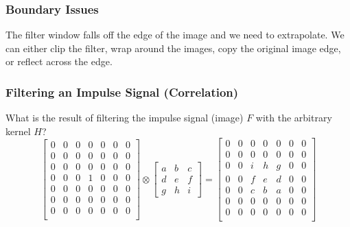 \documentclass{math}
\begin{document}
\subsubsection*{Boundary Issues}
The filter window falls off the edge of the image and we need to extrapolate.
We can either clip the filter, wrap around the images, copy the original image
edge, or reflect across the edge.

\subsubsection*{Filtering an Impulse Signal (Correlation)}
What is the result of filtering the impulse signal (image) \( F \) with the
arbitrary kernel \( H \)?
\[ \begin{bmatrix}
  0 & 0 & 0 & 0 & 0 & 0 & 0 \\
  0 & 0 & 0 & 0 & 0 & 0 & 0 \\
  0 & 0 & 0 & 0 & 0 & 0 & 0 \\
  0 & 0 & 0 & 1 & 0 & 0 & 0 \\
  0 & 0 & 0 & 0 & 0 & 0 & 0 \\
  0 & 0 & 0 & 0 & 0 & 0 & 0 \\
  0 & 0 & 0 & 0 & 0 & 0 & 0 \\
\end{bmatrix}\otimes\begin{bmatrix}
  a & b & c \\
  d & e & f \\
  g & h & i
\end{bmatrix} = \begin{bmatrix}
  0 & 0 & 0 & 0 & 0 & 0 & 0 \\
  0 & 0 & 0 & 0 & 0 & 0 & 0 \\
  0 & 0 & i & h & g & 0 & 0 \\
  0 & 0 & f & e & d & 0 & 0 \\
  0 & 0 & c & b & a & 0 & 0 \\
  0 & 0 & 0 & 0 & 0 & 0 & 0 \\
  0 & 0 & 0 & 0 & 0 & 0 & 0 \\
\end{bmatrix} \]
\end{document}
